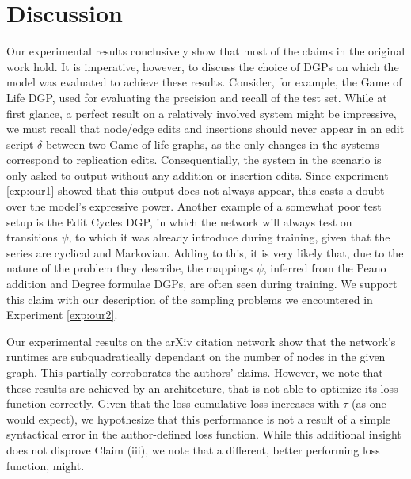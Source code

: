 

\section{Discussion}
\label{sec:discuss}

Our experimental results conclusively show that most of the claims in the original work hold. It is imperative, however, to discuss the choice of DGPs on which the model was evaluated to achieve these results.
Consider, for example, the Game of Life DGP, used for evaluating the precision and recall of the test set. While at first glance, a perfect result on a relatively involved system might be impressive, we must recall that node/edge edits and insertions should never appear in an edit script $\bar{\delta}$ between two Game of life graphs, as the only changes in the systems correspond to replication edits. Consequentially, the system in the scenario is only asked to output without any addition or insertion edits. Since experiment \ref{exp:our1} showed that this output does not always appear, this casts a doubt over the model's expressive power. Another example of a somewhat poor test setup is the Edit Cycles DGP, in which the network will always test on transitions $\psi$, to which it was already introduce during training, given that the series are cyclical and Markovian. Adding to this, it is very likely that, due to the nature of the problem they describe, the mappings $\psi$, inferred from the Peano addition and Degree formulae DGPs, are often seen during training. We support this claim with our description of the sampling problems we encountered in Experiment \ref{exp:our2}.

Our experimental results on the arXiv citation network show that the network's runtimes are subquadratically dependant on the number of nodes in the given graph. This partially corroborates the authors' claims. However, we note that these results are achieved by an architecture, that is not able to optimize its loss function correctly. Given that the loss cumulative loss increases with $\tau$ (as one would expect), we hypothesize that this performance is not a result of a simple syntactical error in the author-defined loss function. While this additional insight does not disprove Claim (iii), 
we note that a different, better performing loss function, might.

